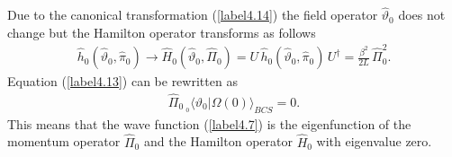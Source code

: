 \documentclass[a4paper,12pt] {article}
\begin{document}
Due to the canonical transformation (\ref{label4.14}) the field
operator $\hat{\vartheta}_0$ does not change but the Hamilton operator
transforms as follows
%
\begin{eqnarray}\label{label4.19}
\hat{h}_0(\hat{\vartheta}_0,\hat{\pi}_0) \to
\hat{H}_0(\hat{\vartheta}_0,\hat{\Pi}_0) =
U\,\hat{h}_0(\hat{\vartheta}_0,\hat{\pi}_0)\,
U^{\dagger} = \frac{\beta^2}{2L}\,\hat{\Pi}^2_0.
\end{eqnarray}
%
Equation (\ref{label4.13}) can be rewritten as 
%
\begin{eqnarray}\label{label4.20}
\hat{\Pi}_0\,{_{_0}\langle \vartheta_0|\Omega(0)\rangle_{BCS}} = 0.
\end{eqnarray}
%
This means that the wave function (\ref{label4.7}) is the
eigenfunction of the momentum operator $\hat{\Pi}_0$ and the Hamilton
operator $\hat{H}_0$ with eigenvalue zero. 
\end{document}
